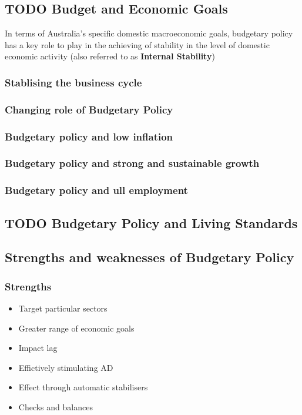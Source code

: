 \documentclass[11pt]{article}
\begin{document}
\subsection{{\bfseries\sffamily TODO} Budget and Economic Goals}
\label{sec-1-10}

In terms of Australia's specific domestic macroeconomic goals,
budgetary policy has a key role to play in the achieving of stability
in the level of domestic economic activity (also referred to as
\textbf{Internal Stability})

\subsubsection{Stablising the business cycle}
\label{sec-1-10-1}

\subsubsection{Changing role of Budgetary Policy}
\label{sec-1-10-2}

\subsubsection{Budgetary policy and low inflation}
\label{sec-1-10-3}

\subsubsection{Budgetary policy and strong and sustainable growth}
\label{sec-1-10-4}

\subsubsection{Budgetary policy and ull employment}
\label{sec-1-10-5}

\subsection{{\bfseries\sffamily TODO} Budgetary Policy and Living Standards}
\label{sec-1-11}

\subsection{Strengths and weaknesses of Budgetary Policy}
\label{sec-1-12}
\subsubsection{Strengths}
\label{sec-1-12-1}
\begin{itemize}
\item Target particular sectors
\item Greater range of economic goals
\item Impact lag
\item Effictively stimulating AD
\item Effect through automatic stabilisers
\item Checks and balances
\end{itemize}
\end{document}
